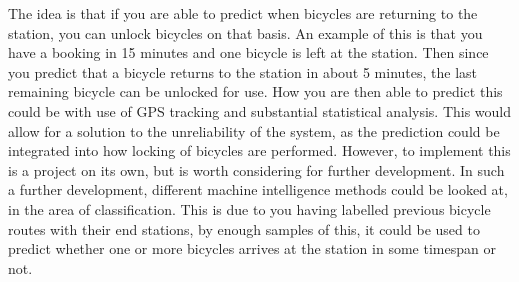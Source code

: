 \begin{description}[style=nextline]
		\item[Prediction]
		The idea is that if you are able to predict when bicycles are returning to the station, you can unlock bicycles on that basis.
		An example of this is that you have a booking in 15 minutes and one bicycle is left at the station. Then since you predict that a bicycle returns to the station in about 5 minutes, the last remaining bicycle can be unlocked for use.
		How you are then able to predict this could be with use of GPS tracking and substantial statistical analysis.
		This would allow for a solution to the unreliability of the system, as the prediction could be integrated into how locking of bicycles are performed.
		However, to implement this is a project on its own, but is worth considering for further development.
		In such a further development, different machine intelligence methods could be looked at, in the area of classification.
		This is due to you having labelled previous bicycle routes with their end stations, by enough samples of this, it could be used to predict whether one or more bicycles arrives at the station in some timespan or not.
\end{description}

